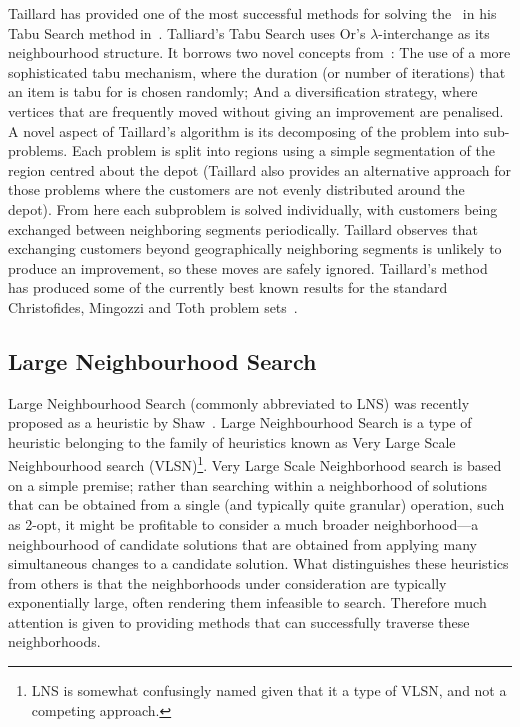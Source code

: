 Taillard has provided one of the most successful methods for solving the \VRP\ in his Tabu Search method in~\cite{Taillard:1993}. Talliard's Tabu Search uses Or's $\lambda$-interchange as its neighbourhood structure. It borrows two novel concepts from~\cite{GHL:1994}: The use of a more sophisticated tabu mechanism, where the duration (or number of iterations) that an item is tabu for is chosen randomly; And a diversification strategy, where vertices that are frequently moved without giving an improvement are penalised. A novel aspect of Taillard's algorithm is its decomposing of the problem into sub-problems. Each problem is split into regions using a simple segmentation of the region centred about the depot (Taillard also provides an alternative approach for those problems where the customers are not evenly distributed around the depot). From here each subproblem is solved individually, with customers being exchanged between neighboring segments periodically. Taillard observes that exchanging customers beyond geographically neighboring segments is unlikely to produce an improvement, so these moves are safely ignored. Taillard's method has produced some of the currently best known results for the standard Christofides, Mingozzi and Toth problem sets~\cite{CMT:1981}. 

\subsection{Large Neighbourhood Search}

Large Neighbourhood Search (commonly abbreviated to LNS) was recently proposed as a heuristic by Shaw~\cite{Shaw:1998}. Large Neighbourhood Search is a type of heuristic belonging to the family of heuristics known as Very Large Scale Neighbourhood search (VLSN)\footnote{LNS is somewhat confusingly named given that it a type of VLSN, and not a competing approach.}. Very Large Scale Neighborhood search is based on a simple premise; rather than searching within a neighborhood of solutions that can be obtained from a single (and typically quite granular) operation, such as 2-opt, it might be profitable to consider a much broader neighborhood---a neighbourhood of candidate solutions that are obtained from applying many simultaneous changes to a candidate solution. What distinguishes these heuristics from others is that the neighborhoods under consideration are typically exponentially large, often rendering them infeasible to search. Therefore much attention is given to providing methods that can successfully traverse these neighborhoods. 

